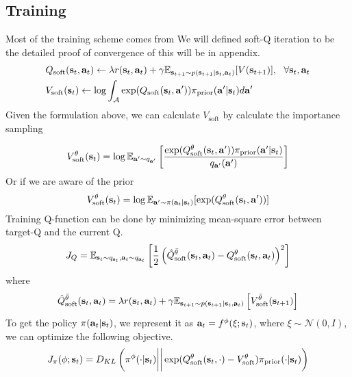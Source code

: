\subsection{Training}
Most of the training scheme comes from \cite{haarnoja2017reinforcement} We will defined soft-Q iteration to be the detailed proof of convergence of this will be in appendix. 
$$
\begin{aligned}
    &Q_{\text{soft}}(\bold{s}_t, \bold{a}_t) \leftarrow \lambda r(\bold{s}_t, \bold{a}_t) + \gamma \mathbb{E}_{\bold{s}_{t+1} \sim p(\bold{s}_{t+1} | \bold{s}_t, \bold{a}_t)}[ V(\bold{s}_{t+1})], \ \ \forall \bold{s}_t, \bold{a}_t \\
    &V_{\text{soft}}(\bold{s}_t) \leftarrow \log \int_{\mathcal{A}} \exp(Q_{\text{soft}}(\bold{s}_t, \bold{a}')) \pi_{\text{prior}}(\bold{a}' | \bold{s}_t) d\bold{a}'
\end{aligned}
$$
Given the formulation above, we can calculate $V_{\text{soft}}$ by calculate the importance sampling

$$
V^{\theta}_{\text{soft}} (\bold{s}_t) = \log \mathbb{E}_{\bold{a}' \sim q_{\bold{a}'}}\left[ \frac{\exp(Q^{\theta}_{\text{soft}}(\bold{s}_t, \bold{a}')) \pi_{\text{prior}} (\bold{a}'| \bold{s}_t) }{q_{\bold{a}'}(\bold{a}')} \right]
$$
Or if we are aware of the prior 
$$
V^{\theta}_{\text{soft}} (\bold{s}_t) = \log \mathbb{E}_{\bold{a}' \sim \pi(\bold{a}_t | \bold{s}_t)} [\exp(Q^{\theta}_{\text{soft}} (\bold{s}_t, \bold{a}'))]
$$
Training Q-function can be done by minimizing mean-square error between target-Q and the current Q.
$$
J_{Q} = \mathbb{E}_{\bold{s}_t \sim q_{\bold{s}_t}, \bold{a}_t \sim q_{\bold{a}_t}} \left[ \frac{1}{2} \left( \hat{Q}^{\bar{\theta}}_{\text{soft}} (\bold{s}_t, \bold{a}_t) - Q^{\theta}_{\text{soft}} (\bold{s}_t, \bold{a}_t) \right)^2 \right]
$$
where 
$$
\hat{Q}^{\bar{\theta}}_{\text{soft}} (\bold{s}_t, \bold{a}_t) = \lambda r(\bold{s}_t, \bold{a}_t) + \gamma \mathbb{E}_{\bold{s}_{t+1} \sim p(\bold{s}_{t+1} | \bold{s}_t, \bold{a}_t)}\left[V^{\bar{\theta}}_{\text{soft}}(\bold{s}_{t+1})\right]
$$
To get the policy $\pi(\bold{a}_t | \bold{s}_t)$, we represent it as $\bold{a}_t = f^{\phi}(\xi ; \bold{s}_t)$, where $\xi \sim \mathcal{N}(0, I)$, we can optimize the following objective.
$$
J_{\pi}(\phi; \bold{s}_t) = D_{KL} \left( \pi^{\phi}(\cdot | \bold{s}_t) \bigg|\bigg| \exp(Q^{\theta}_{\text{soft}}(\bold{s}_t, \cdot) - V^{\theta}_{\text{soft}}) \pi_{\text{prior}}( \cdot | \bold{s}_t ) \right)
$$

